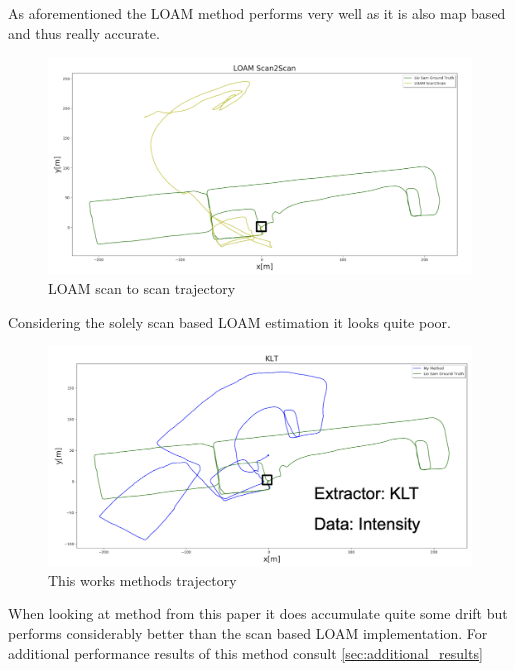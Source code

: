 {{{        As aforementioned the LOAM method performs very well as it is also map based and thus really accurate.
        \clearpage

        \begin{figure}[!ht]
            \centering
            \includegraphics[scale = 0.45]{images/results/loam_s2s_trajectory.png}
            \caption{LOAM scan to scan trajectory}
            \label{fig:loam_s2s_trajectory}
        \end{figure}

        Considering the solely scan based LOAM estimation it looks quite poor.

        \begin{figure}[!ht]
            \centering
            \includegraphics[scale = 0.45]{images/results/mm_trajectory.png}
            \caption{This works methods trajectory}
            \label{fig:mm_trajectory}
        \end{figure}

        When looking at method from this paper it does accumulate quite some drift but performs considerably better than the scan based LOAM implementation. For additional performance results of this method consult \cref{sec:additional_results}
    }
    \clearpage
}

}
